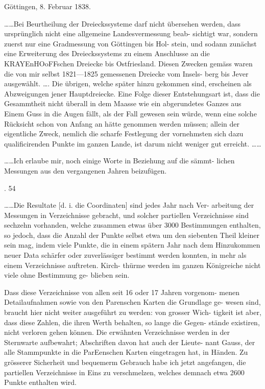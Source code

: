 \documentclass[12pt,a4paper]{article}
\theoremstyle{plain}
\theoremstyle{definition}
\theoremstyle{remark}
\begin{document}
\noindent
Göttingen, 8. Februar 1838.


\noindent
\ldots\ldots Bei Beurtheilung der Dreieckssysteme darf nicht übersehen
werden, dass ursprünglich nicht eine allgemeine Landesvermessung beab-
sichtigt war, sondern zuerst nur eine Gradmessung von Göttingen bis Hol-
stein, und sodann zunächst eine Erweiterung des Dreieckssystems zu einem
Anschlusse an die KRAYEnHOoFFschen Dreiecke bis Ostfriesland. Diesen Zwecken
gemäss waren die von mir selbst 1821---1825 gemessenen Dreiecke vom Insels-
berg bis Jever ausgewählt. \ldots. Die übrigen, welche später hinzu gekommen
sind, erscheinen als Abzweigungen jener Hauptdreiecke. Eine Folge dieser
Entstehungsart ist, dass die Gesammtheit nicht überall in dem Maasse wie ein
abgerundetes Ganzes aus Einem Guss in die Augen fällt, als der Fall gewesen
sein würde, wenn eine solche Rücksicht schon von Anfang an hätte genommen
werden müssen; allein der eigentliche Zweck, nemlich die scharfe Festlegung
der vornehmsten sich dazu qualificirenden Punkte im ganzen Lande, ist darum
nicht weniger gut erreicht. \ldots\ldots


\noindent
\ldots\ldots Ich erlaube mir, noch einige Worte in Beziehung auf die sämmt-
lichen Messungen aus den vergangenen Jahren beizufügen.

\noindent
. 54

\noindent

\noindent
\ldots\ldots Die Resultate [d. i. die Coordinaten] sind jedes Jahr nach Ver-
arbeitung der Messungen in Verzeichnisse gebracht, und solcher partiellen
Verzeichnisse sind sechzehn vorhanden, welche zusammen etwas über 3000
Bestimmungen enthalten, so jedoch, dass die Anzahl der Punkte selbst etwa
um den siebenten Theil kleiner sein mag, indem viele Punkte, die in einem
spätern Jahr nach dem Hinzukommen neuer Data schärfer oder zuverlässiger
bestimmt werden konnten, in mehr als einem Verzeichnisse auftreten. Kirch-
thürme werden im ganzen Königreiche nicht viele ohne Bestimmung ge-
blieben sein.

\noindent
Dass diese Verzeichnisse von allen seit 16 oder 17 Jahren vorgenom-
menen Detailaufnahmen sowie von den Parenschen Karten die Grundlage ge-
wesen sind, braucht hier nicht weiter ausgeführt zu werden: von grosser Wich-
tigkeit ist aber, dass diese Zahlen, die ihren Werth behalten, so lange die Gegen-
stände existiren, nicht verloren gehen können. Die erwähnten Verzeichnisse
werden in der Sternwarte aufbewahrt; Abschriften davon hat auch der Lieute-
nant Gauss, der alle Stammpunkte in die ParEenschen Karten eingetragen hat,
in Händen. Zu grösserer Sicherheit und bequemerm Gebrauch habe ich jetzt
angefangen, die partiellen Verzeichnisse in Eins zu verschmelzen, welches
demnach etwa 2600 Punkte enthalten wird.
\end{document}
